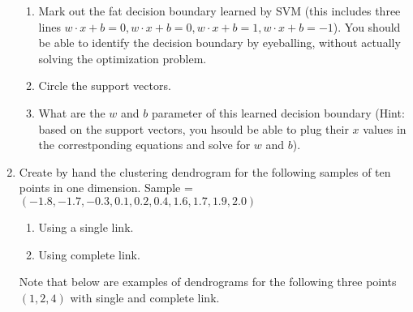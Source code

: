 \documentclass[12pt,letterpaper]{article}
\begin{document}
\begin{enumerate}
	\begin{enumerate} 
		\item Mark out the fat decision boundary learned by SVM (this includes three lines $w\cdot x+b=0, w\cdot x+b=0, w\cdot x+b=1, w\cdot x+b=-1$). You should be able to identify the decision boundary by eyeballing, without actually solving the optimization problem. \\
		\item Circle the support vectors. \\
		\item What are the $w$ and $b$ parameter of this learned decision boundary (Hint: based on the support vectors, you hsould be able to plug their $x$ values in the correstponding equations and solve for $w$ and $b$). \\
	\end{enumerate}
	\item Create by hand the clustering dendrogram for the following samples of ten points in one dimension. Sample = $(-1.8, -1.7, -0.3, 0.1, 0.2, 0.4, 1.6, 1.7, 1.9, 2.0)$ 
	\begin{enumerate} 
		\item Using a single link. \\
		\item Using complete link. \\
	\end{enumerate} 
	Note that below are examples of dendrograms for the following three points $(1,2,4)$ with single and complete link. \\



\end{enumerate} 
\end{document}
